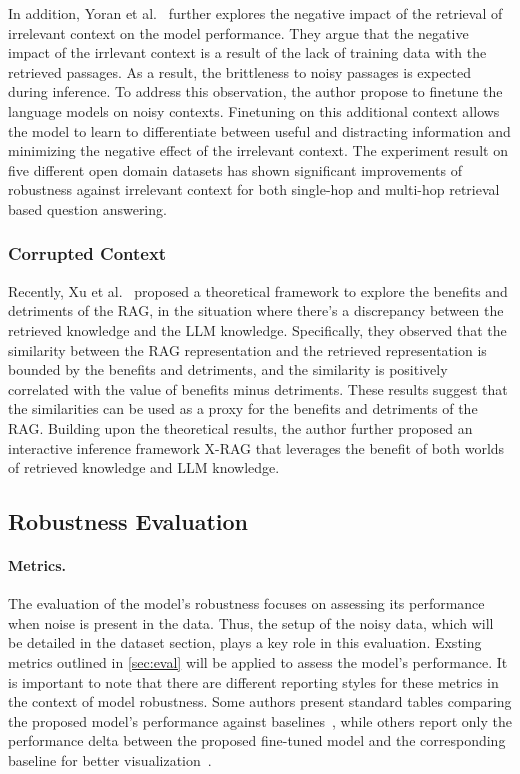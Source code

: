 In addition, Yoran et al.~\cite{robust_rag_iclr_2024} further explores the negative impact of the retrieval of irrelevant context on the model performance. They argue that the negative impact of the irrlevant context is a result of the lack of training data with the retrieved passages. As a result, the brittleness to noisy passages is expected during inference. To address this observation, the author propose to finetune the language models on noisy contexts. Finetuning on this additional context allows the model to learn to differentiate between useful and distracting information and minimizing the negative effect of the irrelevant context. The experiment result on five different open domain datasets has shown significant improvements of robustness against irrelevant context for both single-hop and multi-hop retrieval based question answering. 

\subsubsection{Corrupted Context}
Recently, Xu et al.~\cite{dual_rag_2024} proposed a theoretical framework to explore the benefits and detriments of the RAG, in the situation where there's a discrepancy between the retrieved knowledge and the LLM knowledge. Specifically, they observed that the similarity between the RAG representation and the retrieved representation is bounded by the benefits and detriments, and the similarity is positively correlated with the value of benefits minus detriments. These results suggest that the similarities can be used as a proxy for the benefits and detriments of the RAG. Building upon the theoretical results, the author further proposed an interactive inference framework X-RAG that leverages the benefit of both worlds of retrieved knowledge and LLM knowledge.

\subsection{Robustness Evaluation}
\paragraph{Metrics.}
The evaluation of the model's robustness focuses on assessing its performance when noise is present in the data. Thus, the setup of the noisy data, which will be detailed in the dataset section, plays a key role in this evaluation. Exsting metrics outlined in \ref{sec:eval} will be applied to assess the model's performance. It is important to note that there are different reporting styles for these metrics in the context of model robustness. Some authors present standard tables comparing the proposed model's performance against baselines~\cite{adaptive_adversarial_rag_2024, dual_rag_2024}, while others report only the performance delta between the proposed fine-tuned model and the corresponding baseline for better visualization~\cite{robust_rag_iclr_2024}.


